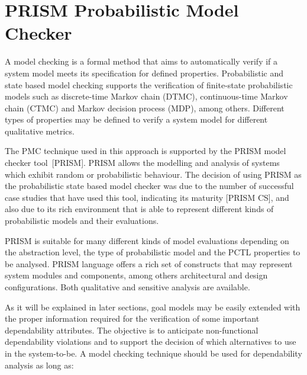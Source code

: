 %
%
%

\section{PRISM Probabilistic Model Checker}

A model checking is a formal method that aims to automatically verify if a system model meets its specification for defined properties. Probabilistic and state based model checking supports the verification of finite-state probabilistic models such as discrete-time Markov chain (DTMC), continuous-time Markov chain (CTMC) and Markov decision process (MDP), among others. Different types of properties may be defined to verify a system model for different qualitative metrics.

The PMC technique used in this approach is supported by the PRISM model checker tool~[PRISM]. PRISM allows the modelling and analysis of systems which exhibit random or probabilistic behaviour. The decision of using PRISM as the probabilistic state based model checker was due to the number of successful case studies that have used this tool, indicating its maturity [PRISM CS], and also due to its rich environment that is able to represent different kinds of probabilistic models and their evaluations. 

PRISM is suitable for many different kinds of model evaluations depending on the abstraction level, the type of probabilistic model and the PCTL properties to be analysed. PRISM language offers a rich set of constructs that may represent system modules and components, among others architectural and design configurations. Both qualitative and sensitive analysis are available.

As it will be explained in later sections, goal models may be easily extended with the proper information required for the verification of some important dependability attributes. The objective is to anticipate non-functional dependability violations and to support the decision of which alternatives to use in the system-to-be. A model checking technique should be used for dependability analysis as long as: 

